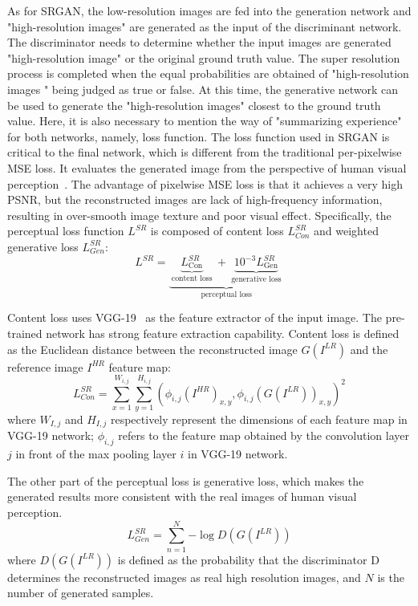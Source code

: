 \documentclass[10pt,twocolumn,letterpaper]{article}
\begin{document}
As for SRGAN, the low-resolution images are fed into the generation network and "high-resolution images" are generated as the input of the discriminant network. The discriminator needs to determine whether the input images are  generated "high-resolution image" or the original ground truth value. The super resolution process is completed when the equal probabilities are obtained of "high-resolution images " being  judged as true or false.  At this time, the generative network can be used to generate the "high-resolution images" closest to the ground truth value. Here, it is also necessary to mention the way of "summarizing experience" for both networks, namely, loss function. The loss function used in SRGAN is critical to the final network, which is different from the traditional per-pixelwise MSE loss. It evaluates the generated image from the perspective of human visual perception~\cite{ledig2017photo}. The advantage of pixelwise MSE loss is that it achieves a very high PSNR, but the reconstructed images are lack of high-frequency information, resulting in over-smooth image texture and poor visual effect. Specifically, the perceptual loss function $L^{SR}$ is composed of content loss $L_{Con}^{SR}$ and weighted generative loss $L_{Gen}^{SR}$:
\begin{equation}\label{eq1}
{L^{SR}} = \underbrace {\underbrace {L_{\text{Con}}^{SR}}_{{\text{ content loss }}} + \underbrace {{{10}^{ - 3}}L_{{\text{Gen}}}^{SR}}_{{\text{ generative loss }}}}_{{\text{perceptual loss}}}
\end{equation}

Content loss uses VGG-19~\cite{simonyan2014very} as the feature extractor of the input image. The pre-trained network has strong feature extraction capability. Content loss is defined as the Euclidean distance between the reconstructed image $G{\left(I^{L R}\right)}$ and the reference image $I^{HR}$ feature map:
\begin{equation}\label{eq２}
L_{Con}^{SR} = \sum\limits_{x = 1}^{{W_{i,j}}} {\sum\limits_{y = 1}^{{H_{i,j}}} {{{\left( {{\phi _{i,j}}{{\left( {{I^{HR}}} \right)}_{x,y}},{\phi _{i,j}}{{\left( {G\left( {{I^{LR}}} \right)} \right)}_{x,y}}} \right)}^2}} } 
\end{equation}
where $W_{I,j}$ and $H_{I,j}$ respectively represent the dimensions of each feature map in VGG-19 network; ${\phi _{i,j}}$ refers to the feature map \cite{ledig2017photo} obtained by the convolution layer $j$ in front of the max pooling layer $i$ in VGG-19 network.

The other part of the perceptual loss is generative loss, which makes the generated results more consistent with the real images of human visual perception.
\begin{equation}\label{eq3}
L_{Gen}^{SR} = \sum\limits_{n = 1}^N { - \log D\left( {G\left( {{I^{LR}}} \right)} \right)} 
\end{equation}
where $D{\left(G\left(I^{L R}\right)\right)}$ is defined as the probability that the discriminator D determines the reconstructed images as real high resolution images, and $N$ is the number of generated samples.
\end{document}
